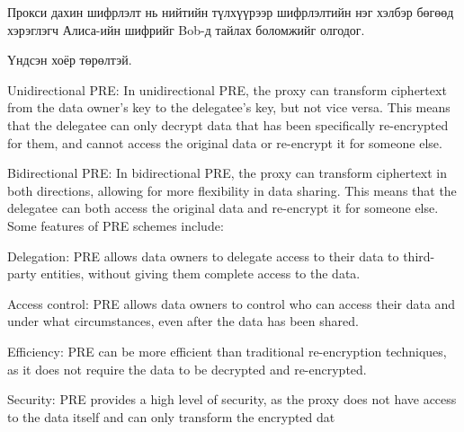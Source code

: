 Прокси дахин шифрлэлт нь нийтийн түлхүүрээр шифрлэлтийн нэг хэлбэр бөгөөд хэрэглэгч Алиса-ийн шифрийг Bob-д тайлах боломжийг олгодог.

Үндсэн хоёр төрөлтэй.

Unidirectional PRE: In unidirectional PRE, the proxy can transform ciphertext from the data owner's key to the delegatee's key, but not vice versa. This means that the delegatee can only decrypt data that has been specifically re-encrypted for them, and cannot access the original data or re-encrypt it for someone else.

Bidirectional PRE: In bidirectional PRE, the proxy can transform ciphertext in both directions, allowing for more flexibility in data sharing. This means that the delegatee can both access the original data and re-encrypt it for someone else.
\\

Some features of PRE schemes include:

Delegation: PRE allows data owners to delegate access to their data to third-party entities, without giving them complete access to the data.

Access control: PRE allows data owners to control who can access their data and under what circumstances, even after the data has been shared.

Efficiency: PRE can be more efficient than traditional re-encryption techniques, as it does not require the data to be decrypted and re-encrypted.

Security: PRE provides a high level of security, as the proxy does not have access to the data itself and can only transform the encrypted dat
